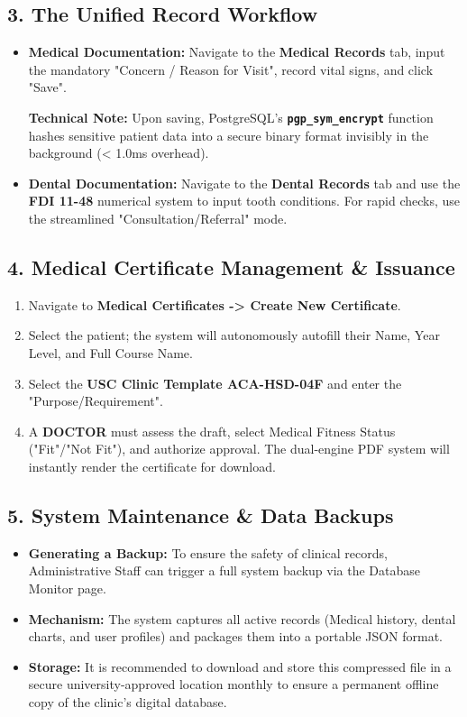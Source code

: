 \subsection{3. The Unified Record Workflow}
\begin{itemize}
    \item \textbf{Medical Documentation:} Navigate to the \textbf{Medical Records} tab, input the mandatory "Concern / Reason for Visit", record vital signs, and click "Save".
    
    \textbf{Technical Note:} Upon saving, PostgreSQL's \textbf{\texttt{pgp\_sym\_encrypt}} function hashes sensitive patient data into a secure binary format invisibly in the background (< 1.0ms overhead).
    
    \item \textbf{Dental Documentation:} Navigate to the \textbf{Dental Records} tab and use the \textbf{FDI 11-48} numerical system to input tooth conditions. For rapid checks, use the streamlined "Consultation/Referral" mode.
\end{itemize}

\subsection{4. Medical Certificate Management \& Issuance}
\begin{enumerate}
    \item Navigate to \textbf{Medical Certificates -> Create New Certificate}.
    \item Select the patient; the system will autonomously autofill their Name, Year Level, and Full Course Name.
    \item Select the \textbf{USC Clinic Template ACA-HSD-04F} and enter the "Purpose/Requirement".
    \item A \textbf{DOCTOR} must assess the draft, select Medical Fitness Status ("Fit"/"Not Fit"), and authorize approval. The dual-engine PDF system will instantly render the certificate for download.
\end{enumerate}

\subsection{5. System Maintenance \& Data Backups}
\begin{itemize}
    \item \textbf{Generating a Backup:} To ensure the safety of clinical records, Administrative Staff can trigger a full system backup via the Database Monitor page.
    \item \textbf{Mechanism:} The system captures all active records (Medical history, dental charts, and user profiles) and packages them into a portable JSON format.
    \item \textbf{Storage:} It is recommended to download and store this compressed file in a secure university-approved location monthly to ensure a permanent offline copy of the clinic's digital database.
\end{itemize}

